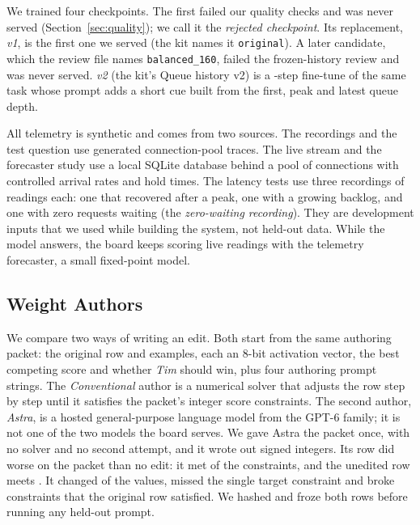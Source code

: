 \documentclass[conference,10pt,letterpaper]{IEEEtran}
\newcommand{\eightbit}{\mbox{8-bit}}
\begin{document}
We trained four checkpoints. The first failed our quality checks and was never served (Section~\ref{sec:quality}); we call it the \emph{rejected checkpoint}. Its replacement, \emph{v1}, is the first one we served (the kit names it \texttt{original}). A later candidate, which the review file names \texttt{balanced\_160}, failed the frozen-history review and was never served. \emph{v2} (the kit's Queue history v2) is a \historySteps-step fine-tune of the same task whose prompt adds a short cue built from the first, peak and latest queue depth.

All telemetry is synthetic and comes from two sources. The recordings and the test question use generated connection-pool traces. The live stream and the forecaster study use a local SQLite database behind a pool of connections with controlled arrival rates and hold times. The latency tests use three recordings of \recordingReadings{} readings each: one that recovered after a peak, one with a growing backlog, and one with zero requests waiting (the \emph{zero-waiting recording}). They are development inputs that we used while building the system, not held-out data. While the model answers, the board keeps scoring live readings with the telemetry forecaster, a small fixed-point model.

\subsection{Weight Authors}
\label{sec:authors}
We compare two ways of writing an edit. Both start from the same authoring packet: the original row and \fitConstraints{} examples, each an \eightbit{} activation vector, the best competing score and whether \emph{Tim} should win, plus four authoring prompt strings. The \emph{Conventional} author is a numerical solver that adjusts the row step by step until it satisfies the packet's \fitConstraints{} integer score constraints. The second author, \emph{Astra}, is a hosted general-purpose language model from the GPT-6 family; it is not one of the two models the board serves. We gave Astra the packet once, with no solver and no second attempt, and it wrote out \rowBytes{} signed integers. Its row did worse on the packet than no edit: it met \astraConstraintsMet{} of the \fitConstraints{} constraints, and the unedited row meets \originalConstraintsMet. It changed \astraChangedValues{} of the \rowBytes{} values, missed the single target constraint and broke \astraBrokeConstraints{} constraints that the original row satisfied. We hashed and froze both rows before running any held-out prompt.
\end{document}
